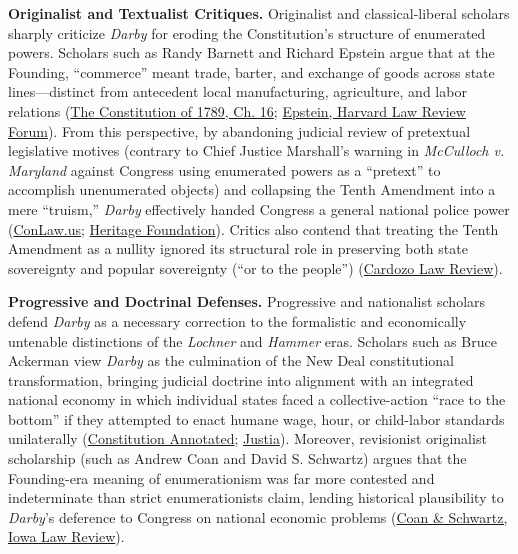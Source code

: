 \documentclass[12pt]{article}
\begin{document}
\textbf{Originalist and Textualist Critiques.} Originalist and classical-liberal scholars sharply criticize \textit{Darby} for eroding the Constitution's structure of enumerated powers. Scholars such as Randy Barnett and Richard Epstein argue that at the Founding, ``commerce'' meant trade, barter, and exchange of goods across state lines---distinct from antecedent local manufacturing, agriculture, and labor relations (\href{https://www.cambridge.org/core/product/D258358C733DF44CEB17E8F616237005/core-reader}{The Constitution of 1789, Ch. 16}; \href{https://harvardlawreview.org/forum/vol-128/an-unapologetic-defense-of-the-classical-liberal-constitution/}{Epstein, Harvard Law Review Forum}). From this perspective, by abandoning judicial review of pretextual legislative motives (contrary to Chief Justice Marshall's warning in \textit{McCulloch v. Maryland} against Congress using enumerated powers as a ``pretext'' to accomplish unenumerated objects) and collapsing the Tenth Amendment into a mere ``truism,'' \textit{Darby} effectively handed Congress a general national police power (\href{https://conlaw.us/case/united-states-v-darby-1941/}{ConLaw.us}; \href{https://www.heritage.org/the-constitution/report/commerce-commerce-everywhere-the-uses-and-abuses-the-commerce-clause}{Heritage Foundation}). Critics also contend that treating the Tenth Amendment as a nullity ignored its structural role in preserving both state sovereignty and popular sovereignty (``or to the people'') (\href{https://www.cardozolawreview.com/popular-sovereignty-tenth-amendment-reese/}{Cardozo Law Review}).

\textbf{Progressive and Doctrinal Defenses.} Progressive and nationalist scholars defend \textit{Darby} as a necessary correction to the formalistic and economically untenable distinctions of the \textit{Lochner} and \textit{Hammer} eras. Scholars such as Bruce Ackerman view \textit{Darby} as the culmination of the New Deal constitutional transformation, bringing judicial doctrine into alignment with an integrated national economy in which individual states faced a collective-action ``race to the bottom'' if they attempted to enact humane wage, hour, or child-labor standards unilaterally (\href{https://www.law.cornell.edu/constitution-conan/article-6/section-None/clause-2/the-new-deal-and-the-presumption-against-preemption}{Constitution Annotated}; \href{https://supreme.justia.com/cases/federal/us/312/100/}{Justia}). Moreover, revisionist originalist scholarship (such as Andrew Coan and David S. Schwartz) argues that the Founding-era meaning of enumerationism was far more contested and indeterminate than strict enumerationists claim, lending historical plausibility to \textit{Darby}'s deference to Congress on national economic problems (\href{https://ilr.law.uiowa.edu/sites/ilr.law.uiowa.edu/files/2024-03/ILR-109-Coan-Schwartz_0.pdf}{Coan \& Schwartz, Iowa Law Review}).
\end{document}
